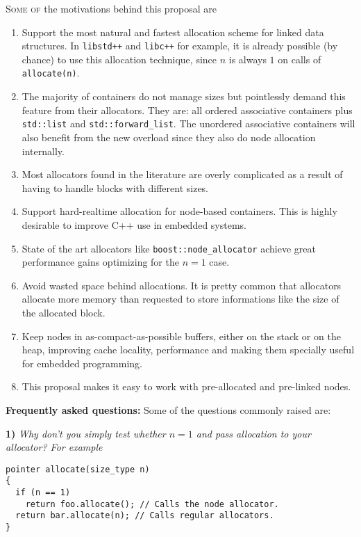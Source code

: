 \documentclass[11pt]{article}
\begin{document}
\textsc{Some of} the motivations behind this proposal are
\begin{enumerate}

\item Support the most natural and fastest allocation scheme for
linked data structures. In \texttt{libstd++} and \texttt{libc++}
for example, it is already possible (by chance) to use this allocation
technique, since $n$ is always $1$ on calls of \texttt{allocate(n)}.

\item The majority of containers do not manage sizes but pointlessly demand
this feature from their allocators. They are: all ordered associative
containers plus \texttt{std::list} and \texttt{std::forward\_list}. The
unordered associative containers will also benefit from the new overload since
they also do node allocation internally.

\item Most allocators found in the literature are overly
complicated as a result of having to handle blocks with different
sizes.

\item Support hard-realtime allocation for node-based containers.
This is highly desirable to improve C++ use in embedded systems.

\item State of the art allocators like \texttt{boost::node\_allocator}
\cite{boost} achieve great performance gains optimizing for the $n = 1$ case. 

\item Avoid wasted space behind allocations. It is pretty common that
allocators allocate more memory than requested to store informations
like the size of the allocated block.

\item Keep nodes in as-compact-as-possible buffers, either on the
stack or on the heap, improving cache locality, performance and making
them specially useful for embedded programming.

\item This proposal makes it easy to work with pre-allocated and
pre-linked nodes.
\end{enumerate}

\medskip
\noindent
{\bf Frequently asked questions:} Some of the questions commonly
raised are:

\medskip
\noindent
{\bf 1) }{\it Why don't you simply test whether $n = 1$ and pass
allocation to your allocator? For example}
\medskip
\begin{lstlisting}
pointer allocate(size_type n)
{
  if (n == 1)
    return foo.allocate(); // Calls the node allocator.
  return bar.allocate(n); // Calls regular allocators.
}
\end{lstlisting}
\end{document}
